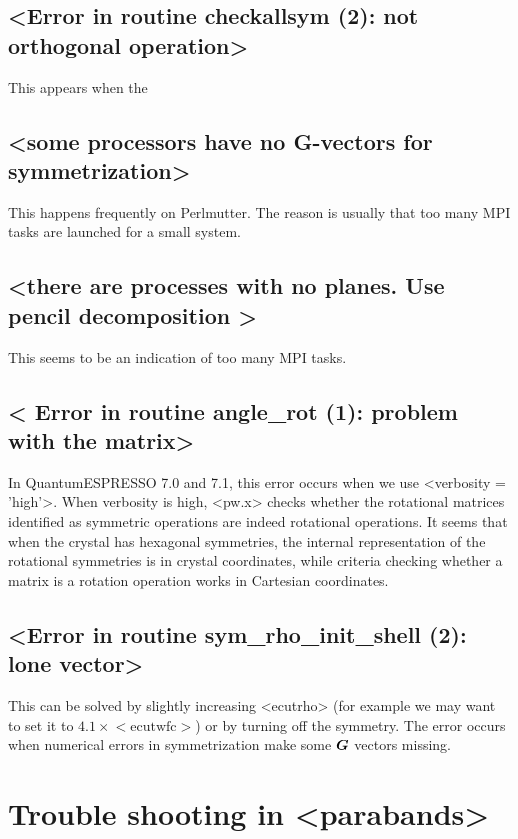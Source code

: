 \documentclass[hyperref, a4paper, 12pt]{report}
\def\texttt#1{<#1>}%
\newcommand{\shortcode}[1]{\texttt{#1}}
\begin{document}
\subsection{\shortcode{Error in routine checkallsym (2): not orthogonal operation}}

This appears when the

\subsection{\shortcode{some processors have no G-vectors for symmetrization}}

This happens frequently on Perlmutter. 
The reason is usually that too many MPI tasks are launched for a small system.

\subsection{\shortcode{there are processes with no planes. Use pencil decomposition }}

This seems to be an indication of too many MPI tasks.

\subsection{\shortcode{ Error in routine angle_rot (1): problem with the matrix}}

In QuantumESPRESSO 7.0 and 7.1, 
this error occurs when we use \shortcode{verbosity = 'high'}.
When verbosity is high, \shortcode{pw.x} checks 
whether the rotational matrices identified as symmetric operations
are indeed rotational operations.
It seems that when the crystal has hexagonal symmetries,
the internal representation of the rotational symmetries 
is in crystal coordinates,
while criteria checking whether a matrix is a rotation operation 
works in Cartesian coordinates.

\subsection{\shortcode{Error in routine sym_rho_init_shell (2): lone vector}}

This can be solved by slightly increasing \shortcode{ecutrho} 
(for example we may want to set it to $4.1 \times \mathrm{\shortcode{ecutwfc}}$)
or by turning off the symmetry.
The error occurs when numerical errors in symmetrization make some $\vb*{G}$ vectors missing.

\section{Trouble shooting in \shortcode{parabands}}
\end{document}
